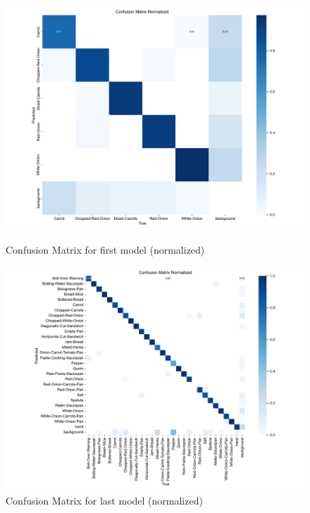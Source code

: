 \documentclass{article}
\begin{document}
    \begin{figure}[htbp]
        \begin{minipage}[htbp]{1\linewidth}
            \centering
            \includegraphics[width=\linewidth]{assets/confusion_matrix_normalized-Version-1.png}
            \caption{Confusion Matrix for first model (normalized)}
        \end{minipage}%
        
        \begin{minipage}[htbp]{1\linewidth}
            \centering
            \includegraphics[width=\linewidth]{assets/confusion_matrix_normalized-Version-6.png}
            \caption{Confusion Matrix for last model (normalized)}
        \end{minipage}
    \end{figure}
    
\end{document}
